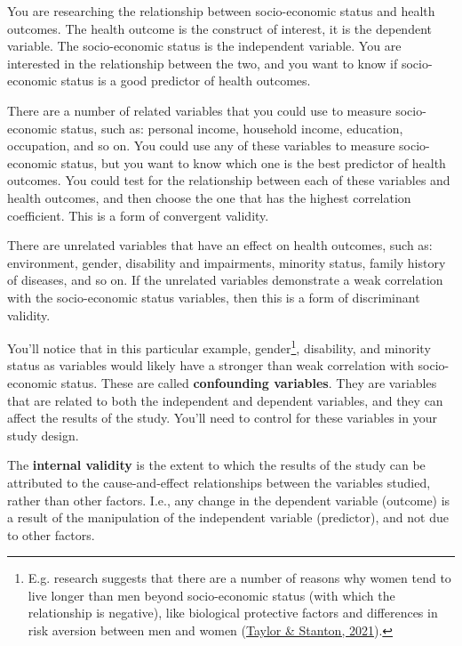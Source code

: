 \documentclass[
  11pt,
  a4paper,
  twoside,symmetric,openright]{book}
\theoremstyle{break}
\theoremstyle{break}
\begin{document}
\begin{example}
\protect\hypertarget{exm:exconstructvalidity}{}\label{exm:exconstructvalidity}You are researching the relationship between socio-economic status and health outcomes. The health outcome is the construct of interest, it is the dependent variable. The socio-economic status is the independent variable. You are interested in the relationship between the two, and you want to know if socio-economic status is a good predictor of health outcomes.

There are a number of related variables that you could use to measure socio-economic status, such as: personal income, household income, education, occupation, and so on. You could use any of these variables to measure socio-economic status, but you want to know which one is the best predictor of health outcomes. You could test for the relationship between each of these variables and health outcomes, and then choose the one that has the highest correlation coefficient. This is a form of convergent validity.

There are unrelated variables that have an effect on health outcomes, such as: environment, gender, disability and impairments, minority status, family history of diseases, and so on. If the unrelated variables demonstrate a weak correlation with the socio-economic status variables, then this is a form of discriminant validity.

You'll notice that in this particular example, gender\footnote{E.g. research suggests that there are a number of reasons why women tend to live longer than men beyond socio-economic status (with which the relationship is negative), like biological protective factors and differences in risk aversion between men and women (\protect\hyperlink{ref-taylorHealthPsychology2021}{Taylor \& Stanton, 2021}).}, disability, and minority status as variables would likely have a stronger than weak correlation with socio-economic status. These are called \textbf{confounding variables}. They are variables that are related to both the independent and dependent variables, and they can affect the results of the study. You'll need to control for these variables in your study design.
\end{example}

\begin{definition}
\protect\hypertarget{def:definternalvalidity}{}\label{def:definternalvalidity}The \textbf{internal validity} is the extent to which the results of the study can be attributed to the cause-and-effect relationships between the variables studied, rather than other factors. I.e., any change in the dependent variable (outcome) is a result of the manipulation of the independent variable (predictor), and not due to other factors.
\end{definition}
\end{document}
